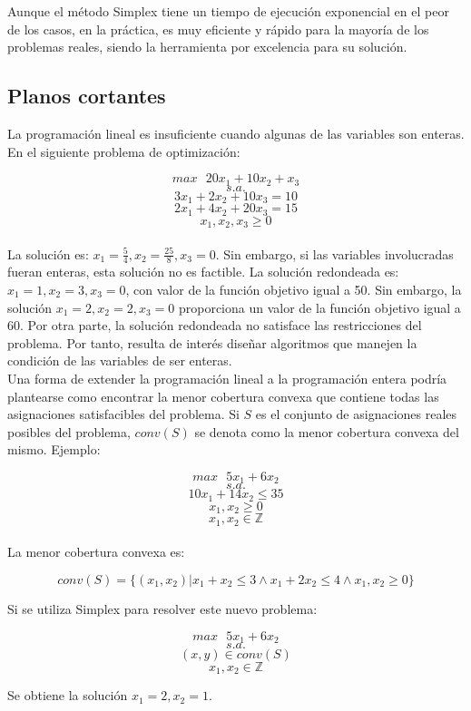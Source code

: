 \documentclass[12pt]{report}
\begin{document}
Aunque el método Simplex tiene un tiempo de ejecución exponencial en el peor de los casos, en la práctica, es muy eficiente y rápido para la mayoría de los problemas reales, siendo la herramienta por excelencia para su solución. 

\subsection{Planos cortantes}

La programación lineal es insuficiente cuando algunas de las variables son enteras. En el siguiente problema de optimización:

$$max \text{ } 20x_1+10x_2+x_3$$
$$s.a.$$
$$3x_1+2x_2+10x_3=10$$
$$2x_1+4x_2+20x_3=15$$
$$x_1,x_2,x_3\geq 0$$\\

La solución es: $x_1 = \frac54,x_2 = \frac{25}{8},x_3 = 0$. Sin embargo, si las variables involucradas fueran enteras, esta solución no es factible. La solución redondeada es: $x_1 = 1,x_2 = 3,x_3 = 0$, con valor de la función objetivo igual a 50. Sin embargo, la solución $x_1 = 2,x_2 = 2,x_3 = 0$ proporciona un valor de la función objetivo igual a 60. Por otra parte, la solución redondeada no satisface las restricciones del problema. Por tanto, resulta de interés diseñar algoritmos que manejen la condición de las variables de ser enteras.\\

Una forma de extender la programación lineal a la programación entera podría plantearse como encontrar la menor cobertura convexa que contiene todas las asignaciones satisfacibles del problema. Si $S$ es el conjunto de asignaciones reales posibles del problema, $conv(S)$ se denota como la menor cobertura convexa del mismo. Ejemplo:

$$max \text{ } 5x_1+6x_2$$
$$s.a.$$
$$10x_1+14x_2 \leq  35$$
$$x_1,x_2\geq 0$$
$$x_1,x_2\in\mathbb{Z}$$\\

La menor cobertura convexa es:

$$conv(S)=\{(x_1,x_2)|x_1+x_2\leq 3 \land x_1+2x_2\leq 4 \land x_1,x_2\geq 0\}$$

Si se utiliza Simplex para resolver este nuevo problema:

$$max \text{ } 5x_1+6x_2$$
$$s.a.$$
$$(x,y) \in conv(S)$$
$$x_1,x_2\in\mathbb{Z}$$

Se obtiene la solución $x_1=2, x_2=1$.\\
\end{document}

